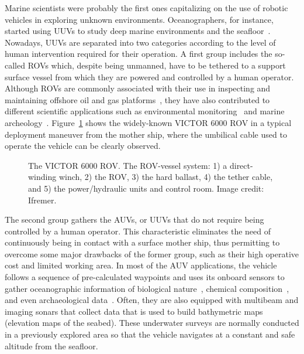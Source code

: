 Marine scientists were probably the first ones capitalizing on the use of
robotic vehicles in exploring unknown environments. Oceanographers, for
instance, started using \acp{UUV} to study deep marine environments and the
seafloor~\cite{Whitcomb2000}. Nowadays, \acp{UUV} are separated into two
categories according to the level of human intervention required for their
operation. A first group includes the so-called \acp{ROV} which, despite being
unmanned, have to be tethered to a support surface vessel from which they are
powered and controlled by a human operator. Although \acp{ROV} are commonly
associated with their use in inspecting and maintaining offshore oil and gas
platforms~\cite{Khan2002}, they have also contributed to different scientific
applications such as environmental monitoring~\cite{Lam2006} and marine
archeology~\cite{Forney2011}. Figure~\ref{fig:rov} shows the widely-known VICTOR
6000 \ac{ROV} in a typical deployment maneuver from the mother ship, where the
umbilical cable used to operate the vehicle can be clearly observed.

\begin{figure}[htbp]
\centering
	 \quad
\caption[VICTOR 6000: a remotely operated vehicle (ROV) and its surface vessel.]
{ The VICTOR 6000 ROV.
 The ROV-vessel system: 1) a direct-winding
winch, 2) the ROV, 3) the hard ballast, 4) the tether
cable, and 5) the power/hydraulic units and control room. Image
credit: Ifremer.
}
\label{fig:rov}
\end{figure}

The second group gathers the \acp{AUV}, or \acp{UUV} that do not require being
controlled by a human operator. This characteristic eliminates the need of
continuously being in contact with a surface mother ship, thus permitting to
overcome some major drawbacks of the former group, such as their high operative
cost and limited working area. In most of the \ac{AUV} applications, the vehicle
follows a sequence of pre-calculated waypoints and uses its onboard sensors to
gather oceanographic information of biological nature~\cite{Grasmueck2006},
chemical composition~\cite{WeiLi2006}, and even archaeological
data~\cite{Bingham2010}. Often, they are also equipped with multibeam and
imaging sonars that collect data that is used to build bathymetric maps
(\ie elevation maps of the seabed). These underwater surveys are normally
conducted in a previously explored area so that the vehicle navigates at a
constant and safe altitude from the seafloor.

